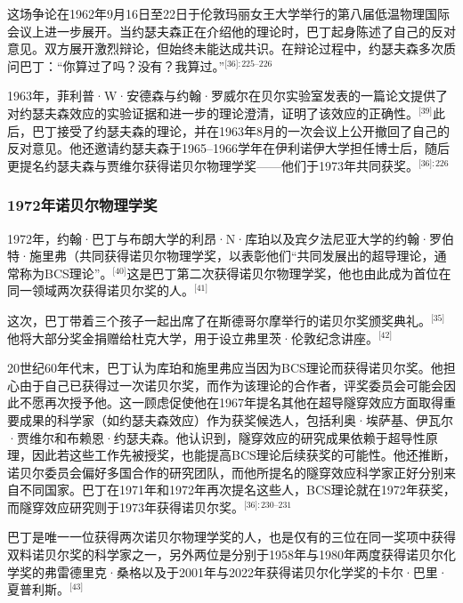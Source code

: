 这场争论在1962年9月16日至22日于伦敦玛丽女王大学举行的第八届低温物理国际会议上进一步展开。当约瑟夫森正在介绍他的理论时，巴丁起身陈述了自己的反对意见。双方展开激烈辩论，但始终未能达成共识。在辩论过程中，约瑟夫森多次质问巴丁：“你算过了吗？没有？我算过。”\(^\text{[36]: 225–226 }\)

1963年，菲利普·W·安德森与约翰·罗威尔在贝尔实验室发表的一篇论文提供了对约瑟夫森效应的实验证据和进一步的理论澄清，证明了该效应的正确性。\(^\text{[39]}\)此后，巴丁接受了约瑟夫森的理论，并在1963年8月的一次会议上公开撤回了自己的反对意见。他还邀请约瑟夫森于1965–1966学年在伊利诺伊大学担任博士后，随后更提名约瑟夫森与贾维尔获得诺贝尔物理学奖——他们于1973年共同获奖。\(^\text{[36]: 226 }\)
\subsubsection{1972年诺贝尔物理学奖}
1972年，约翰·巴丁与布朗大学的利昂·N·库珀以及宾夕法尼亚大学的约翰·罗伯特·施里弗（共同获得诺贝尔物理学奖，以表彰他们“共同发展出的超导理论，通常称为BCS理论”。\(^\text{[40]}\)这是巴丁第二次获得诺贝尔物理学奖，他也由此成为首位在同一领域两次获得诺贝尔奖的人。\(^\text{[41]}\)

这次，巴丁带着三个孩子一起出席了在斯德哥尔摩举行的诺贝尔奖颁奖典礼。\(^\text{[35]}\)他将大部分奖金捐赠给杜克大学，用于设立弗里茨·伦敦纪念讲座。\(^\text{[42]}\)

20世纪60年代末，巴丁认为库珀和施里弗应当因为BCS理论而获得诺贝尔奖。他担心由于自己已获得过一次诺贝尔奖，而作为该理论的合作者，评奖委员会可能会因此不愿再次授予他。这一顾虑促使他在1967年提名其他在超导隧穿效应方面取得重要成果的科学家（如约瑟夫森效应）作为获奖候选人，包括利奥·埃萨基、伊瓦尔·贾维尔和布赖恩·约瑟夫森。他认识到，隧穿效应的研究成果依赖于超导性原理，因此若这些工作先被授奖，也能提高BCS理论后续获奖的可能性。他还推断，诺贝尔委员会偏好多国合作的研究团队，而他所提名的隧穿效应科学家正好分别来自不同国家。巴丁在1971年和1972年再次提名这些人，BCS理论就在1972年获奖，而隧穿效应研究则于1973年获得诺贝尔奖。\(^\text{[36]: 230–231}\) 

巴丁是唯一一位获得两次诺贝尔物理学奖的人，也是仅有的三位在同一奖项中获得双料诺贝尔奖的科学家之一，另外两位是分别于1958年与1980年两度获得诺贝尔化学奖的弗雷德里克·桑格以及于2001年与2022年获得诺贝尔化学奖的卡尔·巴里·夏普利斯。\(^\text{[43]}\)
